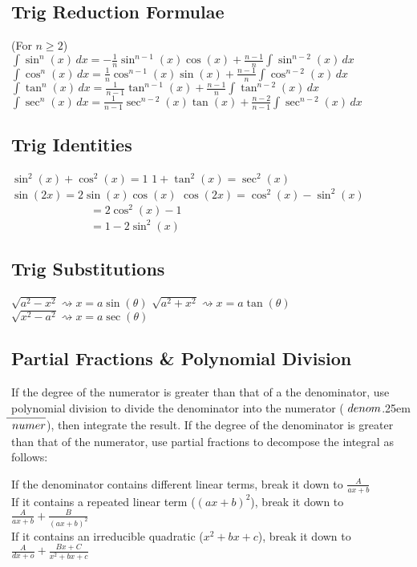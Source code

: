 \documentclass[10pt,landscape,letterpaper]{cheatsheet}
\newcommand\longdiv[2]{%
$\strut#1$\kern.25em\smash{\raise.3ex\hbox{$\big)$}}$\mkern-8mu
        \overline{\enspace\strut#2}$}
\begin{document}
\subsection*{Trig Reduction Formulae} (For $n \geq 2$) \\
$\int \sin^n(x) \,dx = -\frac{1}{n}\sin^{n-1}(x)\cos(x)+\frac{n-1}{n}\int \sin^{n-2}(x) \,dx$\\
$\int \cos^n(x) \,dx = \frac{1}{n}\cos^{n-1}(x)\sin(x)+\frac{n-1}{n}\int \cos^{n-2}(x) \,dx$\\
$\int \tan^n(x) \,dx = \frac{1}{n-1}\tan^{n-1}(x)+\frac{n-1}{n}\int \tan^{n-2}(x) \,dx$\\
$\int \sec^n(x) \,dx = \frac{1}{n-1}\sec^{n-2}(x)\tan(x)+\frac{n-2}{n-1}\int \sec^{n-2}(x) \,dx$\\

\subsection*{Trig Identities}
$\sin^2(x)+\cos^2(x)=1$
$1+\tan^2(x)=\sec^2(x)$
$\sin(2x)=2\sin(x)\cos(x)$
$\cos(2x)=\cos^2(x)-\sin^2(x)$\\
~~~~~~~~~~~~~~$=2\cos^2(x)-1$\\
~~~~~~~~~~~~~~$=1-2\sin^2(x)$

\subsection*{Trig Substitutions}
$\sqrt{a^2-x^2} \rightsquigarrow x=a\sin(\theta)$
$\sqrt{a^2+x^2} \rightsquigarrow x=a\tan(\theta)$
$\sqrt{x^2-a^2} \rightsquigarrow x=a\sec(\theta)$

\subsection*{Partial Fractions \& Polynomial Division}
If the degree of the numerator is greater than that of a the denominator, use polynomial division to
divide the denominator into the numerator (\longdiv{denom}{numer}), then integrate the result. If the degree of the denominator is greater than
that of the numerator, use partial fractions to decompose the integral as follows:

If the denominator contains different linear terms, break it down to $\frac{A}{ax+b}$ \\
If it contains a repeated linear term ($(ax+b)^2$), break it down to $\frac{A}{ax+b}+\frac{B}{(ax+b)^2}$ \\
If it contains an irreducible quadratic ($x^2+bx+c$), break it down to $\frac{A}{dx+o}+\frac{Bx+C}{x^2+bx+c}$ \\
\end{document}
